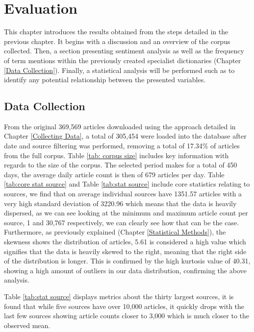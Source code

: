 \chapter{Evaluation}\label{Evalutation}

This chapter introduces the results obtained from the steps detailed in the previous chapter. It begins with a discussion and an overview of the corpus collected. Then, a section presenting sentiment analysis as well as the frequency of term mentions within the previously created specialist dictionaries (Chapter \ref{Data Collection}). Finally, a statistical analysis will be performed such as to identify any potential relationship between the presented variables. 

\section{Data Collection}

From the original 369,569 articles downloaded using the approach detailed in Chapter \ref{Collecting Data}, a total of 305,454 were loaded into the database after date and source filtering was performed, removing a total of 17.34\% of articles from the full corpus. Table \ref{tab: corpus size} includes key information with regards to  the size of the corpus. The selected period makes for a total of 450 days, the average daily article count is then of 679 articles per day. Table \ref{tab:core stat source} and Table \ref{tab:stat source} include core statistics relating to sources, we find that on average individual sources have 1351.57 articles with a very high standard deviation of 3220.96 which means that the data is heavily dispersed, as we can see looking at the minimum and maximum article count per source, 1 and 30,767 respectively, we can clearly see how that can be the case. Furthermore, as previously explained (Chapter \ref{Statistical Methods}), the skewness shows the distribution of articles, 5.61 is considered a high value which signifies that the data is heavily skewed to the right, meaning that the right side of the distribution is longer. This is confirmed by the high kurtosis value of 40.31, showing a high amount of outliers in our data distribution, confirming the above analysis.

Table \ref{tab:stat source} displays metrics about the thirty largest sources, it is found that while five sources have over 10,000 articles, it quickly drops with the last few sources showing article counts closer to 3,000 which is much closer to the observed mean.

